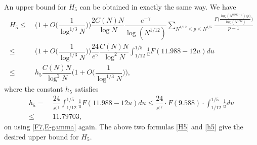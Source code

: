 \documentclass[12pt, a4paper]{amsart}
\def\le{\leqslant}
\theoremstyle{plain}
\theoremstyle{remark}
\numberwithin{equation}{section}
\begin{document}
An upper bound for $H_5$ can be obtained in exactly the same way. We have
\begin{equation}\label{H5}
\begin{aligned}
H_5\le\ & \bigg(1+O\bigg(\dfrac{1}{\log^{1/3}N}\bigg)\bigg)\dfrac{2C(N)N}{\log N}\dfrac{e^{-\gamma}}{\log (N^{1/12})}\sum_{N^{1/12} \le p \le N^{1/5}} \frac{F\bigg(\frac{\log (N^{0.999-\varepsilon}) / p)}{\log (N^{1/12})}\bigg)}{p-1} \\
\le\ & \bigg(1+O\bigg(\dfrac{1}{\log^{1/3}N}\bigg)\bigg)\dfrac{24}{e^{\gamma}}\dfrac{C(N)N}{\log ^2N}\int_{1/12}^{1/5} \frac{1}{u}F(11.988-12u)du\\
\le\ &h_5\dfrac{C(N)N}{\log^2 N} \bigg(1+O\bigg(\dfrac{1}{\log^{1/3}N}\bigg)\bigg),
\end{aligned}
\end{equation}
where the constant $h_5$ satisfies 
\begin{equation}\label{h5}
\begin{aligned}
h_{5}=&\ \dfrac{24}{e^{\gamma}}\int_{1/12}^{1/5} \frac{1}{u}F(11.988-12u)du
\le\dfrac{24}{e^{\gamma}} \cdot F(9.588) \cdot \int_{1/12}^{1/5} \frac{1}{u}du\\
\le&\ 11.79703,
\end{aligned}
\end{equation}
on using \eqref{F7,E-gamma} again. 
The above two formulas \eqref{H5} and \eqref{h5} give the desired upper bound for $H_5$.
\end{document}

